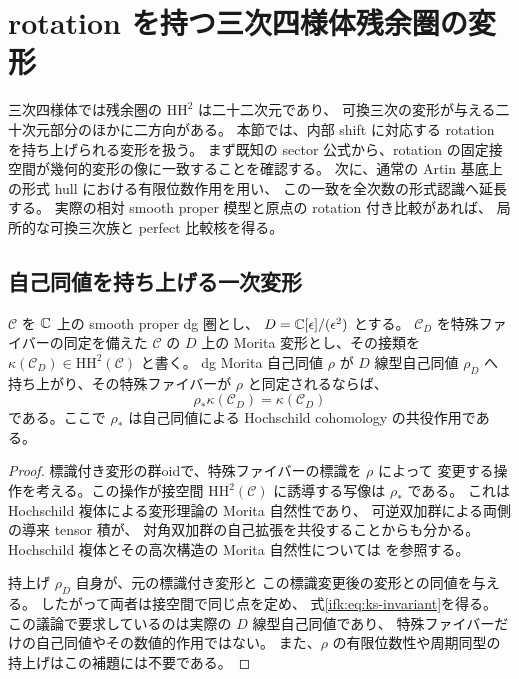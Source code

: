 \section{rotation を持つ三次四様体残余圏の変形}
\label{ifk:sec:rotation-deformations}
\label{ifk:subsec:kodaira-spencer}

三次四様体では残余圏の $\mathrm{HH}^2$ は二十二次元であり、
可換三次の変形が与える二十次元部分のほかに二方向がある。
本節では、内部 shift に対応する rotation を持ち上げられる変形を扱う。
まず既知の sector 公式から、rotation の固定接空間が幾何的変形の像に一致することを確認する。
次に、通常の Artin 基底上の形式 hull における有限位数作用を用い、
この一致を全次数の形式認識へ延長する。
実際の相対 smooth proper 模型と原点の rotation 付き比較があれば、
局所的な可換三次族と perfect 比較核を得る。

\subsection{自己同値を持ち上げる一次変形}

\begin{lemma}
\label{ifk:lem:lifted-autoequivalence}
$\mathcal C$ を $\mathbb C$ 上の smooth proper dg 圏とし、
$D=\mathbb C[\epsilon]/(\epsilon^2)$ とする。
$\mathcal C_D$ を特殊ファイバーの同定を備えた $\mathcal C$ の
$D$ 上の Morita 変形とし、その接類を
$\kappa(\mathcal C_D)\in\mathrm{HH}^2(\mathcal C)$ と書く。
dg Morita 自己同値 $\rho$ が $D$ 線型自己同値
$\rho_D$ へ持ち上がり、その特殊ファイバーが $\rho$ と同定されるならば、
\begin{equation}\label{ifk:eq:ks-invariant}
 \rho_*\kappa(\mathcal C_D)=\kappa(\mathcal C_D)
\end{equation}
である。ここで $\rho_*$ は自己同値による
Hochschild cohomology の共役作用である。
\end{lemma}

\begin{proof}
標識付き変形の群oidで、特殊ファイバーの標識を $\rho$ によって
変更する操作を考える。この操作が接空間
$\mathrm{HH}^2(\mathcal C)$ に誘導する写像は $\rho_*$ である。
これは Hochschild 複体による変形理論の Morita 自然性であり、
可逆双加群による両側の導来 tensor 積が、
対角双加群の自己拡張を共役することからも分かる。
Hochschild 複体とその高次構造の Morita 自然性については
\cite[Section~3.2]{CMOKellerHochschild}を参照する。

持上げ $\rho_D$ 自身が、元の標識付き変形と
この標識変更後の変形との同値を与える。
したがって両者は接空間で同じ点を定め、
式\eqref{ifk:eq:ks-invariant}を得る。
この議論で要求しているのは実際の $D$ 線型自己同値であり、
特殊ファイバーだけの自己同値やその数値的作用ではない。
また、$\rho$ の有限位数性や周期同型の持上げはこの補題には不要である。
\end{proof}

